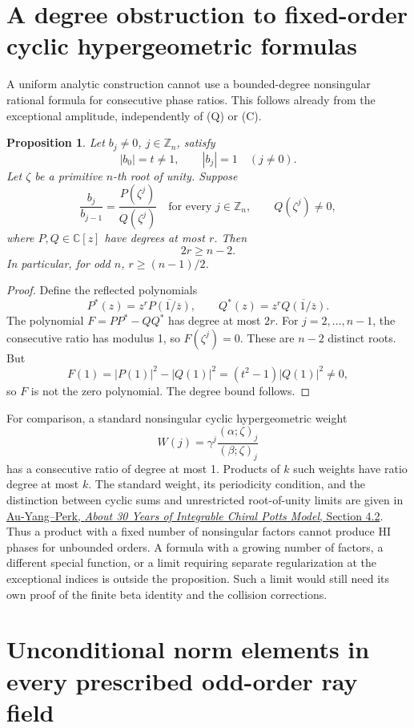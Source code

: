 \documentclass[11pt,reqno]{amsart}
\theoremstyle{plain}
\newtheorem{proposition}[theorem]{Proposition}
\begin{document}
\section{A degree obstruction to fixed-order cyclic hypergeometric formulas}\label{sec:46}

A uniform analytic construction cannot use a bounded-degree nonsingular
rational formula for consecutive phase ratios. This follows already
from the exceptional amplitude, independently of (Q) or (C).

\begin{proposition}
Let \(b_j\ne0\), \(j\in\mathbb Z_n\), satisfy
\[
 |b_0|=t\ne1,\qquad |b_j|=1\quad(j\ne0).
\]
Let \(\zeta\) be a primitive \(n\)-th root of unity. Suppose
\[
 \frac{b_j}{b_{j-1}}=\frac{P(\zeta^j)}{Q(\zeta^j)}
 \quad\text{for every }j\in\mathbb Z_n,
 \qquad Q(\zeta^j)\ne0,
\]
where \(P,Q\in\mathbb C[z]\) have degrees at most \(r\). Then
\[
 \boxed{2r\ge n-2.}
\]
In particular, for odd \(n\), \(r\ge(n-1)/2\).
\end{proposition}

\begin{proof}
Define the reflected polynomials
\[
 P^*(z)=z^r\overline{P(1/\overline z)},\qquad
 Q^*(z)=z^r\overline{Q(1/\overline z)}.
\]
The polynomial \(F=PP^*-QQ^*\) has degree at most \(2r\).
For \(j=2,\ldots,n-1\), the consecutive ratio has modulus 1,
so \(F(\zeta^j)=0\). These are \(n-2\) distinct roots. But
\[
 F(1)=|P(1)|^2-|Q(1)|^2=(t^2-1)|Q(1)|^2\ne0,
\]
so \(F\) is not the zero polynomial. The degree bound follows.
\end{proof}

For comparison, a standard nonsingular cyclic hypergeometric weight
\[
 W(j)=\gamma^j\frac{(\alpha;\zeta)_j}{(\beta;\zeta)_j}
\]
has a consecutive ratio of degree at most 1. Products of \(k\)
such weights have ratio degree at most \(k\). The standard weight,
its periodicity condition, and the distinction between cyclic sums
and unrestricted root-of-unity limits are given in
\href{https://arxiv.org/abs/1601.01014}{Au-Yang--Perk, \emph{About 30 Years of Integrable Chiral Potts Model}, Section 4.2}.
Thus a product with a fixed number of nonsingular factors cannot
produce HI phases for unbounded orders. A formula with a growing
number of factors, a different special function, or a limit requiring
separate regularization at the exceptional indices is outside the
proposition. Such a limit would still need its own proof of the finite
beta identity and the collision corrections.

\section{Unconditional norm elements in every prescribed odd-order ray field}\label{sec:47}
\end{document}
